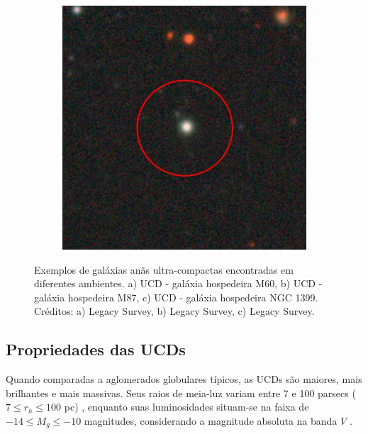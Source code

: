 \begin{figure}[!ht]
\begin{subfigure}[b]{0.3\textwidth}
        \caption{}
    \end{subfigure}
    \begin{subfigure}[b]{0.3\textwidth}
        \includegraphics[width=\textwidth]{Images/ucds_exp/UCD_NGC1399.png}
        \caption{}
    \end{subfigure}
    \caption{Exemplos de galáxias anãs ultra-compactas encontradas em diferentes ambientes. a) UCD - galáxia hospedeira M60, b) UCD - galáxia hospedeira M87, c) UCD - galáxia hospedeira NGC 1399. Créditos: a) Legacy Survey, b) Legacy Survey, c) Legacy Survey.}
    \label{UCDs_exp}
\end{figure}

\subsection{Propriedades das UCDs}\label{subsec:propriedade}
Quando comparadas a aglomerados globulares típicos, as UCDs são maiores, mais brilhantes e mais massivas. Seus raios de meia-luz variam entre 7 e 100 parsecs ($7 \leq r_h \leq 100$ pc) \citep{Mieske_2008_1}, enquanto suas luminosidades situam-se na faixa de $-14 \leq M_g \leq -10$ magnitudes, considerando a magnitude absoluta na banda $V$ \citep{Voggel_2016}.

